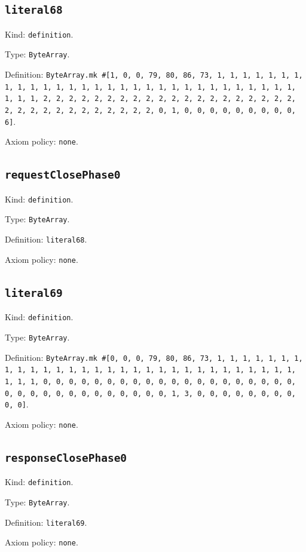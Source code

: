 \documentclass[11pt]{article}
\begin{document}
\subsection*{\texttt{literal68}}
\noindent Kind: \texttt{definition}.\par
\noindent Type: \texttt{ByteArray}.\par
\noindent Definition: \texttt{ByteArray.mk \#[1, 0, 0, 79, 80, 86, 73, 1, 1, 1, 1, 1, 1, 1, 1, 1, 1, 1, 1, 1, 1, 1, 1, 1, 1, 1, 1, 1, 1, 1, 1, 1, 1, 1, 1, 1, 1, 1, 1, 1, 2, 2, 2, 2, 2, 2, 2, 2, 2, 2, 2, 2, 2, 2, 2, 2, 2, 2, 2, 2, 2, 2, 2, 2, 2, 2, 2, 2, 2, 2, 2, 2, 0, 1, 0, 0, 0, 0, 0, 0, 0, 0, 0, 6]}.\par
\noindent Axiom policy: \texttt{none}.\par
\subsection*{\texttt{requestClosePhase0}}
\noindent Kind: \texttt{definition}.\par
\noindent Type: \texttt{ByteArray}.\par
\noindent Definition: \texttt{literal68}.\par
\noindent Axiom policy: \texttt{none}.\par
\subsection*{\texttt{literal69}}
\noindent Kind: \texttt{definition}.\par
\noindent Type: \texttt{ByteArray}.\par
\noindent Definition: \texttt{ByteArray.mk \#[0, 0, 0, 79, 80, 86, 73, 1, 1, 1, 1, 1, 1, 1, 1, 1, 1, 1, 1, 1, 1, 1, 1, 1, 1, 1, 1, 1, 1, 1, 1, 1, 1, 1, 1, 1, 1, 1, 1, 1, 0, 0, 0, 0, 0, 0, 0, 0, 0, 0, 0, 0, 0, 0, 0, 0, 0, 0, 0, 0, 0, 0, 0, 0, 0, 0, 0, 0, 0, 0, 0, 0, 0, 1, 3, 0, 0, 0, 0, 0, 0, 0, 0, 0, 0]}.\par
\noindent Axiom policy: \texttt{none}.\par
\subsection*{\texttt{responseClosePhase0}}
\noindent Kind: \texttt{definition}.\par
\noindent Type: \texttt{ByteArray}.\par
\noindent Definition: \texttt{literal69}.\par
\noindent Axiom policy: \texttt{none}.\par
\end{document}
